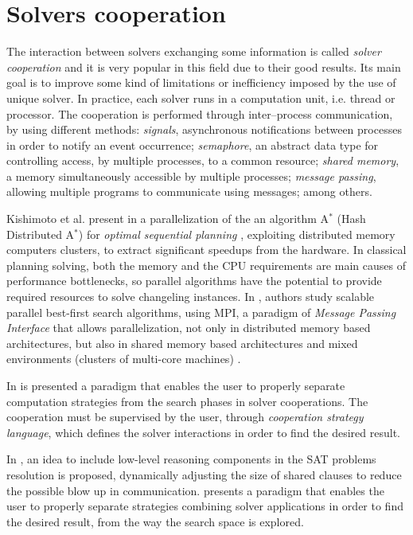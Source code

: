 \section{Solvers cooperation}
\label{sec:cooperation}

The interaction between solvers exchanging some information is called {\it solver cooperation} and it is very popular in this field due to their good results. Its main goal is to improve some kind of limitations or inefficiency imposed by the use of unique solver. In practice, each solver runs in a computation unit, i.e. thread or processor. The cooperation is performed through inter--process communication, by using different methods: \textit{signals}, asynchronous notifications between processes in order to notify an event occurrence; \textit{semaphore}, an abstract data type for controlling access, by multiple processes, to a common resource; \textit{shared memory}, a memory simultaneously accessible by multiple processes; \textit{message passing}, allowing multiple programs to communicate using messages; among others.

Kishimoto et al. present in \cite{Kishimoto2009} a parallelization of the an algorithm A$^*$ (Hash Distributed A$^*$) for \textit{optimal sequential planning} \cite{Schmegner2004}, exploiting distributed memory computers clusters, to extract significant speedups from the hardware. In classical planning solving, both the memory and the CPU requirements are main causes of performance bottlenecks, so parallel algorithms have the potential to provide required resources to solve changeling instances. In \cite{Kishimoto2013}, authors study scalable parallel best-first search algorithms, using MPI, a paradigm of \textit{Message Passing Interface} that allows parallelization, not only in distributed memory based architectures, but also in shared memory based architectures and mixed environments (clusters of multi-core machines) \cite{Grama2003a}.

In \cite{Pajot2003} is presented a paradigm that enables the user to properly separate computation strategies from the search phases in solver cooperations. The cooperation must be supervised by the user, through {\it cooperation strategy language}, which defines the solver interactions in order to find the desired result.

In \cite{Hamadi2012}, an idea to include low-level reasoning components in the SAT problems resolution is proposed, dynamically adjusting the size of shared clauses to reduce the possible blow up in communication. \cite{Pajot2003} presents a paradigm that enables the user to properly separate strategies combining solver applications in order to find the desired result, from the way the search space is explored. 

